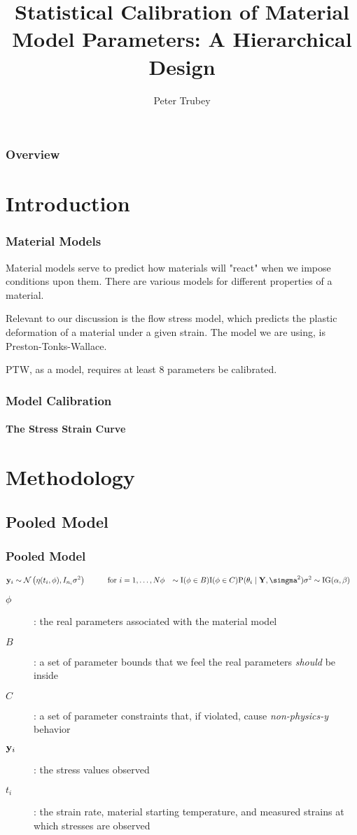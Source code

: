 \documentclass{beamer}
\title{Statistical Calibration of Material Model Parameters: A Hierarchical Design}
\author{Peter Trubey}
\institute[UCSC]{University of California, Santa Cruz}
\begin{document}
\begin{frame}
  \titlepage
\end{frame}

\begin{frame}
  \frametitle{Overview}
  \tableofcontents
\end{frame}

\section{Introduction}
\begin{frame}
  \frametitle{Material Models}
  Material models serve to predict how materials will "react" when we impose
  conditions upon them.  There are various models for different properties of a
  material.

  Relevant to our discussion is the flow stress model, which predicts the plastic
  deformation of a material under a given strain.  The model we are using, is
  Preston-Tonks-Wallace.

  PTW, as a model, requires at least 8 parameters be calibrated.
\end{frame}

\begin{frame}
  \frametitle{Model Calibration}
  \framesubtitle{The Stress Strain Curve}

\end{frame}

\section{Methodology}
\subsection{Pooled Model}
\begin{frame}
  \frametitle{Pooled Model}
  \begin{equation*}
    \begin{aligned}
      {\bf y}_i &\sim \mathcal{N}\left(\eta(t_i, \phi), I_{n_i}\sigma^2\right) \hspace{1cm}\text{for }i = 1,\ldots,N
      \phi &\sim \text{I}(\phi \in B)\text{I}(\phi \in C)
      \text{P}(\theta_i\mid {\bf Y}, {\bf \simgma}^2)
      \sigma^2 &\sim \text{IG}(\alpha,\beta)
      \end{aligned}
  \end{equation*}
  \begin{description}
    \item[$\phi$]: the real parameters associated with the material model
    \item[$B$]: a set of parameter bounds that we feel the real parameters \emph{should} be inside
    \item[$C$]: a set of parameter constraints that, if violated, cause \emph{non-physics-y} behavior
    \item[${\bf y}_i$]: the stress values observed
    \item[$t_i$]: the strain rate, material starting temperature, and measured strains at which stresses are observed
  \end{description}
\end{frame}
\end{document}
